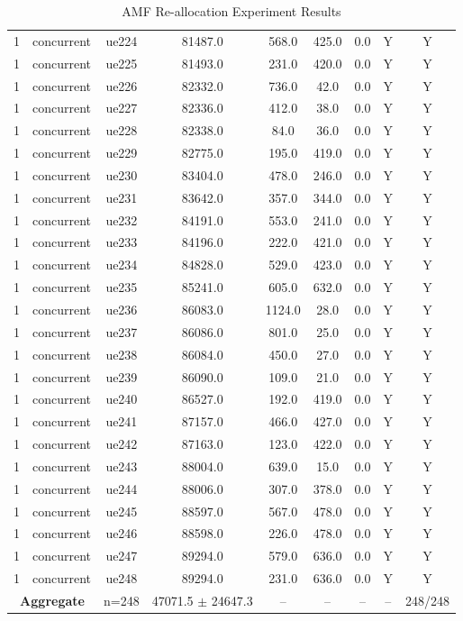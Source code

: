 \begin{table}[ht]
\begin{tabular}{|c|c|c|c|c|c|c|c|c|}
1 & concurrent & ue224 & 81487.0 & 568.0 & 425.0 & 0.0 & Y & Y \\
1 & concurrent & ue225 & 81493.0 & 231.0 & 420.0 & 0.0 & Y & Y \\
1 & concurrent & ue226 & 82332.0 & 736.0 & 42.0 & 0.0 & Y & Y \\
1 & concurrent & ue227 & 82336.0 & 412.0 & 38.0 & 0.0 & Y & Y \\
1 & concurrent & ue228 & 82338.0 & 84.0 & 36.0 & 0.0 & Y & Y \\
1 & concurrent & ue229 & 82775.0 & 195.0 & 419.0 & 0.0 & Y & Y \\
1 & concurrent & ue230 & 83404.0 & 478.0 & 246.0 & 0.0 & Y & Y \\
1 & concurrent & ue231 & 83642.0 & 357.0 & 344.0 & 0.0 & Y & Y \\
1 & concurrent & ue232 & 84191.0 & 553.0 & 241.0 & 0.0 & Y & Y \\
1 & concurrent & ue233 & 84196.0 & 222.0 & 421.0 & 0.0 & Y & Y \\
1 & concurrent & ue234 & 84828.0 & 529.0 & 423.0 & 0.0 & Y & Y \\
1 & concurrent & ue235 & 85241.0 & 605.0 & 632.0 & 0.0 & Y & Y \\
1 & concurrent & ue236 & 86083.0 & 1124.0 & 28.0 & 0.0 & Y & Y \\
1 & concurrent & ue237 & 86086.0 & 801.0 & 25.0 & 0.0 & Y & Y \\
1 & concurrent & ue238 & 86084.0 & 450.0 & 27.0 & 0.0 & Y & Y \\
1 & concurrent & ue239 & 86090.0 & 109.0 & 21.0 & 0.0 & Y & Y \\
1 & concurrent & ue240 & 86527.0 & 192.0 & 419.0 & 0.0 & Y & Y \\
1 & concurrent & ue241 & 87157.0 & 466.0 & 427.0 & 0.0 & Y & Y \\
1 & concurrent & ue242 & 87163.0 & 123.0 & 422.0 & 0.0 & Y & Y \\
1 & concurrent & ue243 & 88004.0 & 639.0 & 15.0 & 0.0 & Y & Y \\
1 & concurrent & ue244 & 88006.0 & 307.0 & 378.0 & 0.0 & Y & Y \\
1 & concurrent & ue245 & 88597.0 & 567.0 & 478.0 & 0.0 & Y & Y \\
1 & concurrent & ue246 & 88598.0 & 226.0 & 478.0 & 0.0 & Y & Y \\
1 & concurrent & ue247 & 89294.0 & 579.0 & 636.0 & 0.0 & Y & Y \\
1 & concurrent & ue248 & 89294.0 & 231.0 & 636.0 & 0.0 & Y & Y \\
\multicolumn{2}{|c|}{\textbf{Aggregate}} & n=248 & 47071.5 $\pm$ 24647.3 & -- & -- & -- & -- & 248/248 \\
\hline
\end{tabular}
\caption{AMF Re-allocation Experiment Results}
\label{tab:amf_realloc}
\end{table}
